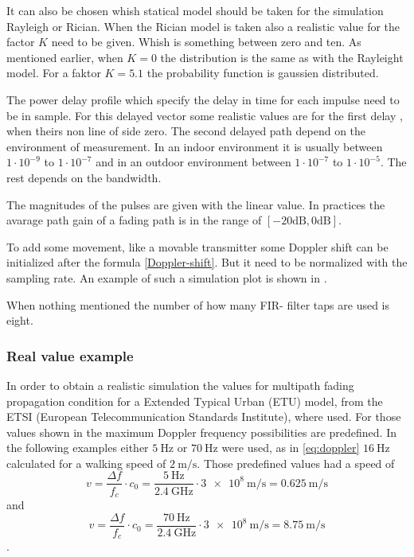 It can also be chosen whish statical model should be taken for the simulation Rayleigh or Rician. When the Rician model is taken also a realistic value for the factor \(K\) need to be given. Whish is something between zero and ten. As mentioned earlier, when  \(K=0\) the distribution is the same as with the Rayleight model. For a faktor \(K = 5.1\) the probability function is gaussien distributed.

The power delay profile which specify the delay in time for each impulse need to be in sample. For this delayed vector some realistic values are for the first delay \cite{Mathworks}, when theirs non line of side zero. The second delayed path depend on the environment of measurement. In an indoor environment it is usually between \(1\cdot10^{-9}\) to \(1\cdot10^{-7}\) and in an outdoor environment between \(1\cdot10^{-7}\) to \(1\cdot10^{-5}\). The rest depends on  the bandwidth. 

The magnitudes of the pulses are given with the linear value. In practices the avarage path gain of a fading path is in the range of \([ -20 \text{dB} , 0\text{dB}]\).

To add some movement, like a movable transmitter some Doppler shift can be initialized after the formula \eqref{Doppler-shift}. But it need to be normalized with the sampling rate. 
An example of such a simulation plot is shown in .

When nothing mentioned the number of how many FIR- filter taps are used is eight.

\subsubsection{Real value example}

In order to obtain a realistic simulation the values for multipath fading propagation condition for a Extended Typical Urban (ETU) model, from the ETSI (European Telecommunication Standards Institute), where used\cite{ETSI}. For those values shown in  the maximum Doppler frequency possibilities are predefined. In the following examples  either \(\SI{5}{\hertz}\) or \(\SI{70}{\hertz}\) were used, as in \eqref{eq:doppler} \(\SI{16}{\hertz}\) calculated for a walking speed of \(\SI{2}{\meter\per\second}\). Those predefined values had a speed of
\begin{equation}
	v = \frac{\Delta f}{f_c}\cdot c_0 = \frac{\SI{5}{\hertz}}{\SI{2.4}{\giga\hertz}}\cdot \SI{3e8}{\meter\per\second}= \SI{0.625}{\meter\per\second}
\end{equation}
and
\begin{equation}
	v = \frac{\Delta f}{f_c}\cdot c_0 = \frac{\SI{70}{\hertz}}{\SI{2.4}{\giga\hertz}}\cdot \SI{3e8}{\meter\per\second}= \SI{8.75}{\meter\per\second}
\end{equation}.

